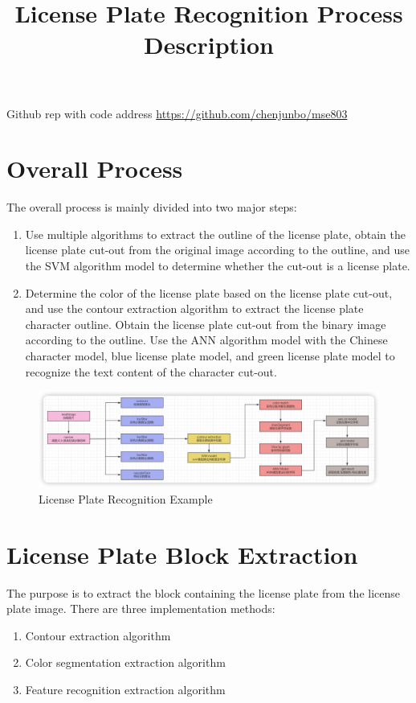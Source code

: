 \documentclass{article}
\title{License Plate Recognition Process Description}
\begin{document}
	\maketitle
	Github rep with code address \url{https://github.com/chenjunbo/mse803}
	
	\section{Overall Process}
	The overall process is mainly divided into two major steps:
	\begin{enumerate}
		\item Use multiple algorithms to extract the outline of the license plate, obtain the license plate cut-out from the original image according to the outline, and use the SVM algorithm model to determine whether the cut-out is a license plate.
		\item Determine the color of the license plate based on the license plate cut-out, and use the contour extraction algorithm to extract the license plate character outline. Obtain the license plate cut-out from the binary image according to the outline. Use the ANN algorithm model with the Chinese character model, blue license plate model, and green license plate model to recognize the text content of the character cut-out.
	\end{enumerate}
	
	\begin{figure}[H]
		\centering
		\includegraphics[width=\linewidth]{mdpic/image-20240925000409837.png}
		\caption{License Plate Recognition Example}
	\end{figure}
	
	\section{License Plate Block Extraction}
	The purpose is to extract the block containing the license plate from the license plate image. There are three implementation methods:
	\begin{enumerate}
		\item Contour extraction algorithm
		\item Color segmentation extraction algorithm
		\item Feature recognition extraction algorithm
	\end{enumerate}
	
\end{document}
